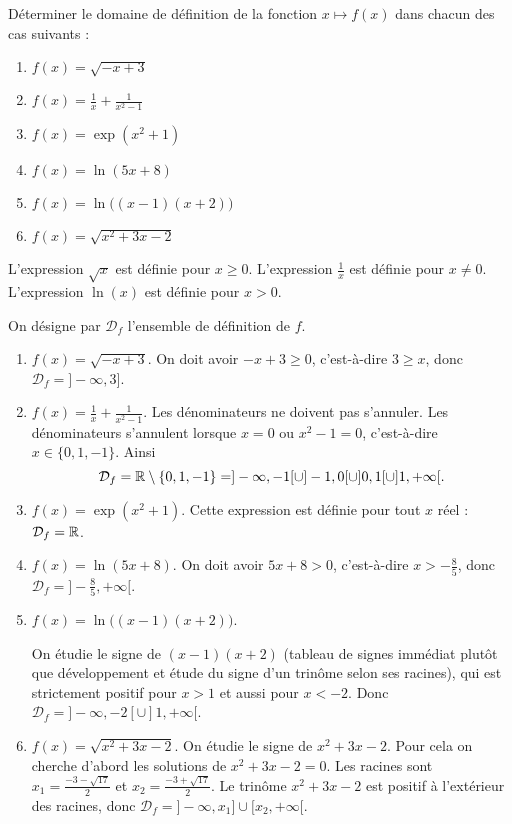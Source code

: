 \documentclass[11pt,class=report,crop=false]{standalone}
\begin{document}
\exercice{}
\enonce
Déterminer le domaine de définition de la fonction $x \mapsto f(x)$ dans chacun des cas suivants :
\begin{enumerate}
    \item $f(x) = \sqrt{-x+3}$
    \item $f(x) = \frac{1}{x} + \frac{1}{x^2-1}$
    \item $f(x) = \exp(x^2+1)$
    \item $f(x) = \ln( 5x + 8 )$
    \item $f(x) = \ln\big( (x-1)(x+2) \big)$
    \item $f(x) = \sqrt{ x^2+3x-2 }$
\end{enumerate} 
\finenonce

\indication
L'expression $\sqrt{x}$ est définie pour $x\ge0$.
L'expression $\frac1x$ est définie pour $x\neq0$.
L'expression $\ln(x)$ est définie pour $x>0$.
\finindication

\correction
On désigne par $\mathcal{D}_f$ l'ensemble de définition de $f$.
\begin{enumerate}
    \item $f(x) = \sqrt{-x+3}$.
    On doit avoir $-x+3\ge0$, c'est-à-dire $3 \ge x$, donc $\mathcal{D}_f = ]-\infty,3]$.
    
    \item $f(x) = \frac{1}{x} + \frac{1}{x^2-1}$.
    Les dénominateurs ne doivent pas s'annuler.
    Les dénominateurs s'annulent lorsque $x = 0$ ou $x^2-1 = 0$, c'est-à-dire 
    $x \in \{0,1,-1\}$. 
    Ainsi 
    $$\mathcal{D}_f = \mathbb{R} \setminus \{0,1,-1\} = ]-\infty,-1[ \cup ]-1,0[ \cup ]0,1[ \cup ]1,+\infty[.$$
    
    
    \item $f(x) = \exp(x^2+1)$.
    Cette expression est définie pour tout $x$ réel :  $\mathcal{D}_f = \mathbb{R}$.
    
    \item $f(x) = \ln( 5x + 8 )$.
    On doit avoir $5x+8 > 0$, c'est-à-dire $x > -\frac85$, donc $\mathcal{D}_f = ]-\frac85,+\infty[$.
    
    \item $f(x) = \ln\big( (x-1)(x+2) \big)$.
    
    On étudie le signe de $(x-1)(x+2)$ (tableau de signes immédiat plutôt que développement et étude du signe d'un trinôme selon ses racines), qui est strictement positif pour $x>1$ et aussi pour $x<-2$.
    Donc $\mathcal{D}_f = ]-\infty,-2[ \cup ]1,+\infty[$.
    
    \item $f(x) = \sqrt{ x^2+3x-2 }$.
    On étudie le signe de $x^2+3x-2$. Pour cela on cherche d'abord les solutions de $x^2+3x-2=0$.
    Les racines sont  $x_1 = \frac{-3 - \sqrt{17}}{2}$ et $x_2 = \frac{-3 + \sqrt{17}}{2}$.
    Le trinôme $x^2+3x-2$ est positif à l'extérieur des racines, donc 
    $\mathcal{D}_f = ]-\infty,x_1] \cup [x_2,+\infty[$.
    
\end{enumerate} 
\fincorrection
\finexercice
\end{document}
